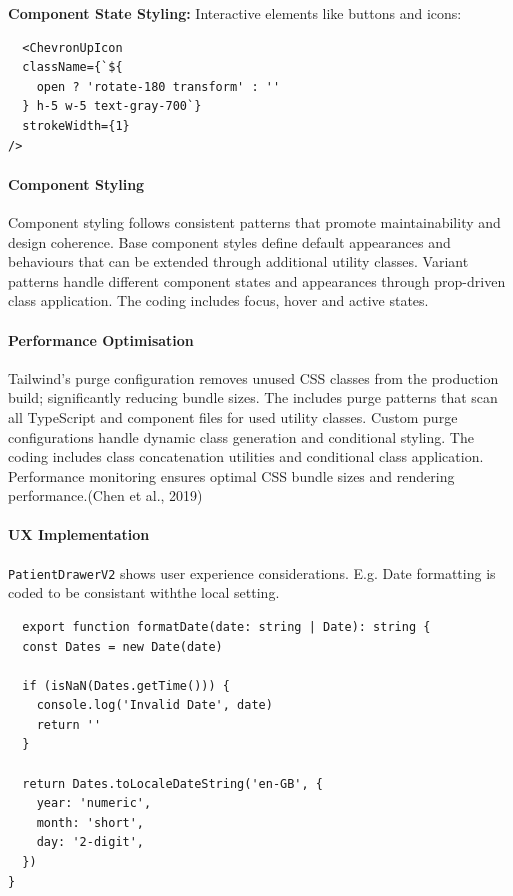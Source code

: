 \textbf{Component State Styling:} Interactive elements like buttons and icons:
\begin{verbatim}
  <ChevronUpIcon
  className={`${
    open ? 'rotate-180 transform' : ''
  } h-5 w-5 text-gray-700`}
  strokeWidth={1}
/>
\end{verbatim}

\paragraph{Component Styling}\mbox{}

Component styling follows consistent patterns that promote maintainability and design coherence. Base component styles define default appearances and behaviours that can be extended through additional utility classes. Variant patterns handle different component states and appearances through prop-driven class application. The coding includes focus, hover and active states.

\paragraph{Performance Optimisation}\mbox{}


Tailwind's purge configuration removes unused CSS classes from the production build; significantly reducing bundle sizes. The includes purge patterns that scan all TypeScript and component files for used utility classes. Custom purge configurations handle dynamic class generation and conditional styling. The coding includes class concatenation utilities and conditional class application. Performance monitoring ensures optimal CSS bundle sizes and rendering performance.(Chen et al., 2019)

\paragraph{UX Implementation}\mbox{}

\texttt{PatientDrawerV2} shows user experience considerations. E.g. Date formatting is coded to be consistant withthe local setting.
\begin{verbatim}
  export function formatDate(date: string | Date): string {
  const Dates = new Date(date)

  if (isNaN(Dates.getTime())) {
    console.log('Invalid Date', date)
    return ''
  }

  return Dates.toLocaleDateString('en-GB', {
    year: 'numeric',
    month: 'short',
    day: '2-digit',
  })
}
\end{verbatim}

